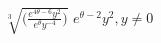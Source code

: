 {$\displaystyle \sqrt[3]{\Bigg(\frac{e^{4\theta-6}y^2}{e^{\theta}y^{-4}}\Bigg)}$}
{$\displaystyle e^{\theta-2}y^2, y \neq 0$}
